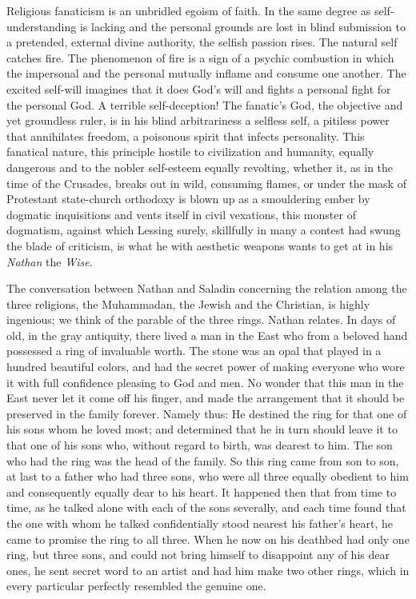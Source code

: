 \documentclass[12pt,a4paper,openany]{book}
\newcommand{\opage}[1]{\marginnote{\footnotesize\textit{[#1]}}}
\begin{document}
Religious fanaticism is an unbridled egoism of faith.
In the same degree as self-understanding is lacking and the personal
grounds are lost in blind submission to a
pretended, external divine authority, the
selfish passion rises. The natural self catches fire.
The phenomenon of fire is a sign of a psychic combustion in which
the impersonal and the personal mutually inflame and consume
one another. The excited self-will imagines that it does
God's will and fights a personal fight for the personal
God. A terrible self-deception! The fanatic's God,
the objective and yet groundless ruler, is in his blind
arbitrariness a selfless self, a pitiless power that
annihilates freedom, a poisonous spirit that infects personality.
This fanatical nature, this principle hostile to
\setcounter{footnote}{0}%
\opage{608}civilization and humanity, equally dangerous and to the
nobler self-esteem equally revolting, whether it, as
in the time of the Crusades, breaks out in wild, consuming flames,
or under the mask of Protestant state-church
orthodoxy is blown up as a smouldering ember by dogmatic
inquisitions and vents itself in civil vexations,
this monster of dogmatism, against which Lessing
surely, skillfully in many a contest had swung the blade
of criticism, is what he with aesthetic weapons wants
to get at in his \emph{Nathan} the \emph{Wise}.

The conversation between Nathan and Saladin concerning
the relation among the three religions, the Muhammadan,
the Jewish and the Christian, is highly ingenious; we
think of the parable of the three rings. Nathan relates.
In days of old, in the gray antiquity, there lived
a man in the East who from a beloved hand possessed a
ring of invaluable worth. The stone was an opal that
played in a hundred beautiful colors, and had the secret
power of making everyone who wore it with full
confidence pleasing to God and men. No wonder
that this man in the East never let it come off his
finger, and made the arrangement that it should be preserved
in the family forever. Namely thus: He destined
the ring for that one of his sons whom he loved
most; and determined that he in turn should leave it
to that one of his sons who, without regard to birth, was
dearest to him. The son who had the ring was
the head of the family. So this ring came from son
to son, at last to a father who had three sons,
who were all three equally obedient to him and consequently equally dear
to his heart. It happened then that from time to time, as
\setcounter{footnote}{0}%
\opage{609}he talked alone with each of the sons severally,
and each time found that the one with whom he talked confidentially
stood nearest his father's heart, he came to promise the ring
to all three. When he now on his deathbed had
only one ring, but three sons, and could not bring himself to
disappoint any of his dear ones, he sent secret word
to an artist and had him make two other rings, which
in every particular perfectly resembled the genuine one.
\end{document}
